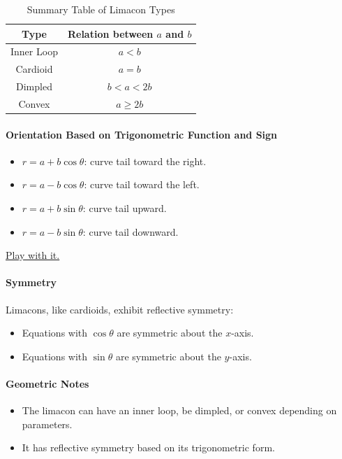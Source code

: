 \begin{table}[H]
  \centering
  \begin{tabular}{|c|c|}
    \hline
    \textbf{Type} & \textbf{Relation between \( a \) and \( b \)} \\
    \hline
    Inner Loop    & \( a < b \) \\
    Cardioid      & \( a = b \) \\
    Dimpled       & \( b < a < 2b \) \\
    Convex        & \( a \geq 2b \) \\
    \hline
  \end{tabular}
  \label{tab:limacon-summary}
  \caption{Summary Table of Limacon Types}
\end{table}

\paragraph{Orientation Based on Trigonometric Function and Sign}
\begin{itemize}
  \item \( r = a + b\cos\theta \): curve tail toward the right.
  \item \( r = a - b\cos\theta \): curve tail toward the left.
  \item \( r = a + b\sin\theta \): curve tail upward.
  \item \( r = a - b\sin\theta \): curve tail downward.
\end{itemize}

\href{https://www.desmos.com/calculator/sy2ovrnwpp}{Play with it.}

\paragraph{Symmetry}
Limacons, like cardioids, exhibit reflective symmetry:
\begin{itemize}
  \item Equations with \(\cos\theta\) are symmetric about the $x$-axis.
  \item Equations with \(\sin\theta\) are symmetric about the $y$-axis.
\end{itemize}

\paragraph{Geometric Notes}
\begin{itemize}
  \item The limacon can have an inner loop, be dimpled, or convex depending on parameters.
  \item It has reflective symmetry based on its trigonometric form.
\end{itemize}


